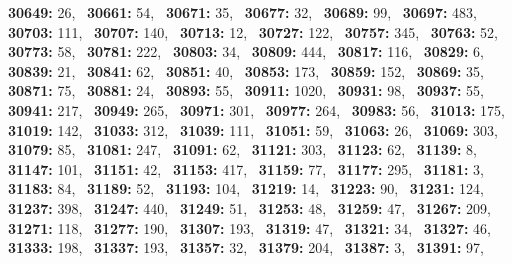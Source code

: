 \textbf{30649:} 26,\allowbreak~ 
\textbf{30661:} 54,\allowbreak~ 
\textbf{30671:} 35,\allowbreak~ 
\textbf{30677:} 32,\allowbreak~ 
\textbf{30689:} 99,\allowbreak~ 
\textbf{30697:} 483,\allowbreak~ 
\textbf{30703:} 111,\allowbreak~ 
\textbf{30707:} 140,\allowbreak~ 
\textbf{30713:} 12,\allowbreak~ 
\textbf{30727:} 122,\allowbreak~ 
\textbf{30757:} 345,\allowbreak~ 
\textbf{30763:} 52,\allowbreak~ 
\textbf{30773:} 58,\allowbreak~ 
\textbf{30781:} 222,\allowbreak~ 
\textbf{30803:} 34,\allowbreak~ 
\textbf{30809:} 444,\allowbreak~ 
\textbf{30817:} 116,\allowbreak~ 
\textbf{30829:} 6,\allowbreak~ 
\textbf{30839:} 21,\allowbreak~ 
\textbf{30841:} 62,\allowbreak~ 
\textbf{30851:} 40,\allowbreak~ 
\textbf{30853:} 173,\allowbreak~ 
\textbf{30859:} 152,\allowbreak~ 
\textbf{30869:} 35,\allowbreak~ 
\textbf{30871:} 75,\allowbreak~ 
\textbf{30881:} 24,\allowbreak~ 
\textbf{30893:} 55,\allowbreak~ 
\textbf{30911:} 1020,\allowbreak~ 
\textbf{30931:} 98,\allowbreak~ 
\textbf{30937:} 55,\allowbreak~ 
\textbf{30941:} 217,\allowbreak~ 
\textbf{30949:} 265,\allowbreak~ 
\textbf{30971:} 301,\allowbreak~ 
\textbf{30977:} 264,\allowbreak~ 
\textbf{30983:} 56,\allowbreak~ 
\textbf{31013:} 175,\allowbreak~ 
\textbf{31019:} 142,\allowbreak~ 
\textbf{31033:} 312,\allowbreak~ 
\textbf{31039:} 111,\allowbreak~ 
\textbf{31051:} 59,\allowbreak~ 
\textbf{31063:} 26,\allowbreak~ 
\textbf{31069:} 303,\allowbreak~ 
\textbf{31079:} 85,\allowbreak~ 
\textbf{31081:} 247,\allowbreak~ 
\textbf{31091:} 62,\allowbreak~ 
\textbf{31121:} 303,\allowbreak~ 
\textbf{31123:} 62,\allowbreak~ 
\textbf{31139:} 8,\allowbreak~ 
\textbf{31147:} 101,\allowbreak~ 
\textbf{31151:} 42,\allowbreak~ 
\textbf{31153:} 417,\allowbreak~ 
\textbf{31159:} 77,\allowbreak~ 
\textbf{31177:} 295,\allowbreak~ 
\textbf{31181:} 3,\allowbreak~ 
\textbf{31183:} 84,\allowbreak~ 
\textbf{31189:} 52,\allowbreak~ 
\textbf{31193:} 104,\allowbreak~ 
\textbf{31219:} 14,\allowbreak~ 
\textbf{31223:} 90,\allowbreak~ 
\textbf{31231:} 124,\allowbreak~ 
\textbf{31237:} 398,\allowbreak~ 
\textbf{31247:} 440,\allowbreak~ 
\textbf{31249:} 51,\allowbreak~ 
\textbf{31253:} 48,\allowbreak~ 
\textbf{31259:} 47,\allowbreak~ 
\textbf{31267:} 209,\allowbreak~ 
\textbf{31271:} 118,\allowbreak~ 
\textbf{31277:} 190,\allowbreak~ 
\textbf{31307:} 193,\allowbreak~ 
\textbf{31319:} 47,\allowbreak~ 
\textbf{31321:} 34,\allowbreak~ 
\textbf{31327:} 46,\allowbreak~ 
\textbf{31333:} 198,\allowbreak~ 
\textbf{31337:} 193,\allowbreak~ 
\textbf{31357:} 32,\allowbreak~ 
\textbf{31379:} 204,\allowbreak~ 
\textbf{31387:} 3,\allowbreak~ 
\textbf{31391:} 97,\allowbreak~ 
